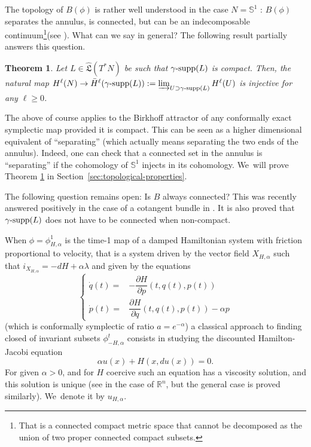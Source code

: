 \documentclass[10pt]{amsart}
\newtheorem{thm}{Theorem}[section]
\theoremstyle{definition}
\newcommand{\bS}{\mathbb{S}}
\DeclareMathOperator{\gammasupp}{\gamma\textup{-supp}}
\newcommand{\fL}{\mathfrak {L}}
\newcommand{\hatL}{\widehat{\fL}}
\begin{document}
The topology of $B(\phi)$ is rather well understood in the case $N=\bS^1$ : $B(\phi)$ separates the annulus, is connected, but can be an indecomposable continuum\footnote{That is a connected compact metric space that cannot be decomposed as the union of two proper connected compact subsets.}(see \cite{Charpentier-1, Charpentier-2}). What can we say in general? The following result partially answers this question.

\begin{thm}\label{th:cohomology}
Let $L \in \hatL(T^*N)$ be such that $\gammasupp(L)$ is compact.
Then, the natural map $H^\ell(N)\to \bar H^\ell(\gammasupp(L)):=\varinjlim_{U\supset \gammasupp(L)} H^\ell(U)$ is injective for any $\ell \geq 0$.
\end{thm}

The above of course applies to the Birkhoff attractor of any conformally exact symplectic map provided it is compact. This can be seen as a higher dimensional equivalent of ``separating'' (which actually means separating the two ends of the annulus). Indeed, one can check that a connected set in the annulus is ``separating'' if the cohomology of $\bS^1$ injects in its cohomology. We~will prove Theorem \ref{th:cohomology} in Section~\ref{sec:topological-properties}.

The following question remains open: Is $B$ always connected?
This was recently answered positively in the case of a cotangent bundle in \cite{AGHIV}. It is also proved that $\gammasupp(L)$ does not have to be connected when non-compact.

When $\phi=\phi_{H,\alpha}^1$ is the time-1 map of a damped Hamiltonian system with friction proportional to velocity, that is a system driven by the vector field $X_{H, \alpha}$ such that $i_{X_{H, \alpha}}=-dH+\alpha\lambda$ and given by the equations
\[
\begin{cases}
\dot q(t)=& -\dfrac{\partial H}{\partial p}(t,q(t),p(t))\\[8pt]
\dot p(t)=& \dfrac{\partial H}{\partial q}(t,q(t),p(t))-\alpha p
\end{cases}
\]
(which is conformally symplectic of ratio $a=e^{-\alpha}$) a classical approach to finding closed of invariant subsets $\phi_{-H,\alpha}^t$ consists in studying the discounted Hamilton-Jacobi equation
\begin{equation}
\label{eq:HJ-discounted}
\alpha u(x) + H(x,du(x))=0.
\end{equation}
For given $\alpha >0$, and for $H$ coercive such an equation has a viscosity solution, and this solution is unique (see \cite{Lions1982, Barles} in the case of ${\mathbb R}^n$, but the general case is proved similarly). We~denote it by $u_{H,\alpha}$.
\end{document}
